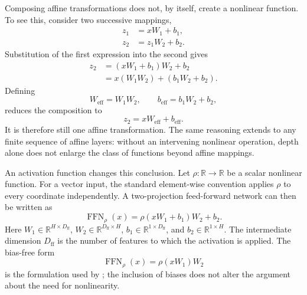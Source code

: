 Composing affine transformations does not, by itself, create a nonlinear
function. To see this, consider two successive mappings,
\begin{align}
    z_1 &= xW_1+b_1,
    \label{eq:act-affine-first}
    \\
    z_2 &= z_1W_2+b_2.
    \label{eq:act-affine-second}
\end{align}
Substitution of the first expression into the second gives
\begin{align}
    z_2
    &= (xW_1+b_1)W_2+b_2
    \nonumber\\
    &=x(W_1W_2)+(b_1W_2+b_2).
    \label{eq:act-affine-composition}
\end{align}
Defining
\begin{equation}
    W_{\mathrm{eff}}=W_1W_2,
    \qquad
    b_{\mathrm{eff}}=b_1W_2+b_2,
    \label{eq:act-effective-affine-parameters}
\end{equation}
reduces the composition to
\begin{equation}
    z_2=xW_{\mathrm{eff}}+b_{\mathrm{eff}}.
    \label{eq:act-composed-affine}
\end{equation}
It is therefore still one affine transformation. The same reasoning
extends to any finite sequence of affine layers: without an intervening
nonlinear operation, depth alone does not enlarge the class of functions
beyond affine mappings.

An activation function changes this conclusion. Let
\(\rho:\mathbb{R}\rightarrow\mathbb{R}\) be a scalar nonlinear function.
For a vector input, the standard element-wise convention applies \(\rho\)
to every coordinate independently. A two-projection feed-forward network
can then be written as
\begin{equation}
    \operatorname{FFN}_{\rho}(x)
    =
    \rho(xW_1+b_1)W_2+b_2.
    \label{eq:act-ffn-general}
\end{equation}
Here \(W_1\in\mathbb{R}^{H\times D_{\mathrm{ff}}}\),
\(W_2\in\mathbb{R}^{D_{\mathrm{ff}}\times H}\),
\(b_1\in\mathbb{R}^{1\times D_{\mathrm{ff}}}\), and
\(b_2\in\mathbb{R}^{1\times H}\). The intermediate dimension
\(D_{\mathrm{ff}}\) is the number of features to which the activation is
applied. The bias-free form
\begin{equation}
    \operatorname{FFN}_{\rho}(x)=\rho(xW_1)W_2
    \label{eq:act-ffn-source-form}
\end{equation}
is the formulation used by \textcite{zhuo2025polycom}; the inclusion of
biases does not alter the argument about the need for nonlinearity.

